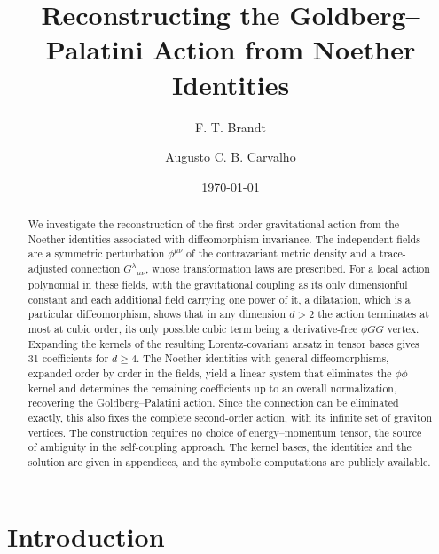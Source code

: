 \documentclass[prd,aps,preprint,nofootinbib,amsmath,amssymb,eqsecnum]{revtex4-2}
\begin{document}
\title{Reconstructing the Goldberg--Palatini Action from Noether Identities}

\author{F. T. Brandt}
\author{Augusto C. B. Carvalho}

\date{\today}

\begin{abstract}
We investigate the reconstruction of the first-order gravitational action from the Noether
identities associated with diffeomorphism invariance. The independent fields are a symmetric
perturbation $\phi^{\mu\nu}$ of the contravariant metric density and a trace-adjusted
connection $G^{\lambda}{}_{\mu\nu}$, whose transformation laws are prescribed. For a local
action polynomial in these fields, with the gravitational coupling as its only dimensionful
constant and each additional field carrying one power of it, a dilatation, which is a
particular diffeomorphism, shows that in any dimension $d>2$ the action terminates at most at
cubic order, its only possible cubic term being a derivative-free $\phi GG$ vertex. Expanding the kernels of the resulting Lorentz-covariant ansatz in tensor
bases gives 31 coefficients for $d\geq4$. The Noether identities with general
diffeomorphisms, expanded order by order in the fields, yield a linear system that eliminates
the $\phi\phi$ kernel and determines the remaining coefficients up to an overall
normalization, recovering the Goldberg--Palatini action. Since the connection can be
eliminated exactly, this also fixes the complete second-order action, with its infinite set
of graviton vertices. The construction requires no choice of energy--momentum tensor, the
source of ambiguity in the self-coupling approach. The kernel bases, the identities and the
solution are given in appendices, and the symbolic computations are publicly available.
\end{abstract}

\maketitle


\section{Introduction}
\label{sec:introduction}
\end{document}
